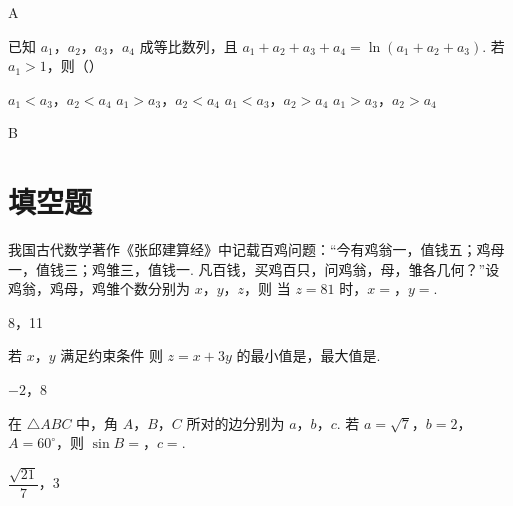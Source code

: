 \begin{answer}
A
\end{answer}

\begin{problem}
已知 \(a_1\)，\(a_2\)，\(a_3\)，\(a_4\) 成等比数列，且 \(a_1+a_2+a_3+a_4=\ln(a_1+a_2+a_3)\). 若 \(a_1>1\)，则（\quad）

\choices
    {\(a_1<a_3\)，\(a_2<a_4\)}
    {\(a_1>a_3\)，\(a_2<a_4\)}
    {\(a_1<a_3\)，\(a_2>a_4\)}
    {\(a_1>a_3\)，\(a_2>a_4\)}
\end{problem}

\begin{answer}
B
\end{answer}

\section{填空题}

\begin{problem}
我国古代数学著作《张邱建算经》中记载百鸡问题：“今有鸡翁一，值钱五；鸡母一，值钱三；鸡雏三，值钱一. 凡百钱，买鸡百只，问鸡翁，母，雏各几何？”设鸡翁，鸡母，鸡雏个数分别为 \(x\)，\(y\)，\(z\)，则
当 \(z=81\) 时，\(x=\)\fillinblank{}，\(y=\)\fillinblank{}.
\end{problem}

\begin{answer}
8，11
\end{answer}

\begin{problem}
若 \(x\)，\(y\) 满足约束条件
则 \(z=x+3y\) 的最小值是\fillinblank{}，最大值是\fillinblank{}.
\end{problem}

\begin{answer}
\(-2\)，8
\end{answer}

\begin{problem}
在 \(\triangle ABC\) 中，角 \(A\)，\(B\)，\(C\) 所对的边分别为 \(a\)，\(b\)，\(c\). 若 \(a=\sqrt7\)，\(b=2\)，\(A=60^\circ\)，则 \(\sin B=\)\fillinblank{}，\(c=\)\fillinblank{}.
\end{problem}

\begin{answer}
\(\dfrac{\sqrt{21}}{7}\)，3
\end{answer}

